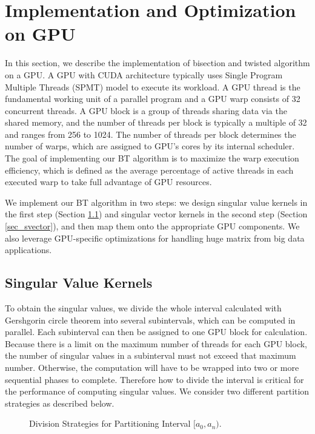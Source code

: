 \section{Implementation and Optimization on GPU}
\label{sec:implementation}
In this section, we describe the implementation of bisection and twisted algorithm on a GPU.
A GPU with CUDA architecture typically uses Single Program Multiple Threads (SPMT) model to execute its workload. 
A GPU thread is the fundamental working unit of a parallel program and a GPU warp consists of 32 concurrent threads. 
A GPU block is a group of threads sharing data via the shared memory, and the number of threads per block is typically a multiple of 32 and ranges from 256 to 1024. The number of threads per block determines the number of warps, which are assigned to GPU's cores by its internal scheduler.
The goal of implementing our BT algorithm is to maximize the warp execution efficiency, which is defined as the average percentage of active threads in each executed warp to take full advantage of GPU resources.

We implement our BT algorithm in two steps: 
we design singular value kernels in the first step (Section \ref{sec_svalue}) and singular vector kernels in the second step (Section \ref{sec_svector}), and then map them onto the appropriate GPU components. We also leverage GPU-specific optimizations for handling huge matrix from big data applications.

\subsection{Singular Value Kernels}
\label{sec_svalue}
To obtain the singular values, we divide the whole interval calculated with Gershgorin circle theorem into several subintervals, which can be computed in parallel.
Each subinterval can then be assigned to one GPU block for calculation.
Because there is a limit on the maximum number of threads for each GPU block,
the number of singular values in a subinterval must not exceed that maximum number. Otherwise, the computation will have to be wrapped into two or more sequential phases to complete.
Therefore how to divide the interval is critical for the performance of
computing singular values. We consider two different partition
strategies as described below. 
\begin{figure}[hbpt]
\centering
  \caption{Division Strategies for Partitioning Interval  $[a_0, a_n)$.}
\vspace{-0.1in}
\end{figure}

